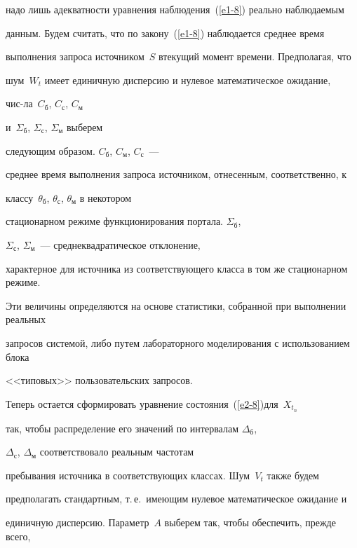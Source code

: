 надо лишь адекватности уравнения наблюдения~(\ref{e1-8}) реально наблюдаемым 


данным. Будем считать, что по закону~(\ref{e1-8}) наблюдается среднее время 


выполнения запроса источником~$S$ в\linebreak текущий момент времени. Предполагая, что 


шум~$W_t$ имеет единичную дисперсию и нулевое математическое ожидание, 


чис-\linebreak ла~$C_{\mathrm{б}}$, $C_{\mathrm{с}}$, $C_{\mathrm{м}}$ 


и~$\Sigma_{\mathrm{б}}$, $\Sigma_{\mathrm{с}}$, $\Sigma_{\mathrm{м}}$ выберем 


следующим образом. $C_{\mathrm{б}}$, $C_{\mathrm{м}}$, $C_{\mathrm{с}}$~--- 


среднее время выполнения запроса источником, отнесенным, соответственно, к 


классу~$\theta_{\mathrm{б}}$, $\theta_{\mathrm{с}}$, $\theta_{\mathrm{м}}$ в некотором 


стационарном режиме функционирования портала. $\Sigma_{\mathrm{б}}$, 


$\Sigma_{\mathrm{с}}$, $\Sigma_{\mathrm{м}}$~--- среднеквадратическое отклонение, 


характерное для источника из соответствующего класса в том же стационарном режиме. 


Эти величины определяются на основе статистики, собранной при выполнении реальных 


запросов системой, либо путем лабораторного моделирования с использованием блока 


<<типовых>> пользовательских запросов.


      


      Теперь остается сформировать уравнение состояния~(\ref{e2-8})\linebreak для~$X_{t_n}$ 


так, чтобы распределение его значений по интервалам $\Delta_{\mathrm{б}}$, 


$\Delta_{\mathrm{с}}$, $\Delta_{\mathrm{м}}$ соответствовало реальным частотам 


пребывания источника в соответствующих классах. Шум~$V_t$ также будем 


предполагать стандартным, т.\,е.\ имеющим нулевое математическое ожидание и 


единичную дисперсию. Параметр~$A$ выберем так, чтобы обеспечить, прежде всего, 


